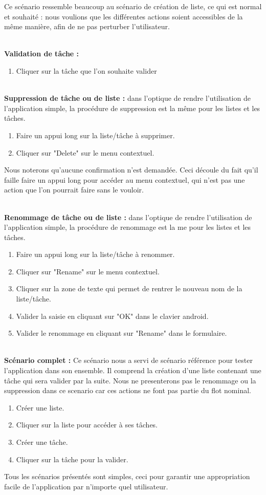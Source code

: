 \documentclass[a4paper, 11pt, french]{report}
\begin{document}
Ce scénario ressemble beaucoup au scénario de création de liste, ce qui est normal et souhaité : nous voulions que les différentes actions soient accessibles de la même manière, afin de ne pas perturber l'utilisateur.

~\\
\textbf{Validation de tâche : }
\begin{enumerate}
	\item Cliquer sur la tâche que l'on souhaite valider
\end{enumerate}

~\\
\textbf{Suppression de tâche ou de liste : } dans l'optique de rendre l'utilisation de l'application simple, la procédure de suppression est la même pour les listes et les tâches.
\begin{enumerate}
	\item Faire un appui long sur la liste/tâche à supprimer.
	\item Cliquer sur "Delete" sur le menu contextuel.
\end{enumerate}

Nous noterons qu'aucune confirmation n'est demandée. Ceci découle du fait qu'il faille faire un appui long pour accéder au menu contextuel, qui n'est pas une action que l'on pourrait faire sans le vouloir.

~\\
\textbf{Renommage de tâche ou de liste : } dans l'optique de rendre l'utilisation de l'application simple, la procédure de renommage est la me pour les listes et les tâches.
\begin{enumerate}
	\item Faire un appui long sur la liste/tâche à renommer.
	\item Cliquer sur "Rename" sur le menu contextuel.
	\item Cliquer sur la zone de texte qui permet de rentrer le nouveau nom de la liste/tâche.
	\item Valider la saisie en cliquant sur "OK" dans le clavier android.
	\item Valider le renommage en cliquant sur "Rename" dans le formulaire.
\end{enumerate}

~\\
\textbf{Scénario complet : } Ce scénario nous a servi de scénario référence pour tester l'application dans son ensemble. Il comprend la création d'une liste contenant une tâche qui sera valider par la suite. Nous ne presenterons pas le renommage ou la suppression dans ce scenario car ces actions ne font pas partie du flot nominal.
\begin{enumerate}
	\item Créer une liste.
	\item Cliquer sur la liste pour accéder à ses tâches.
	\item Créer une tâche.
	\item Cliquer sur la tâche pour la valider.
\end{enumerate}
Tous les scénarios présentés sont simples, ceci pour garantir une appropriation facile de l'application par n'importe quel utilisateur.
\end{document}
